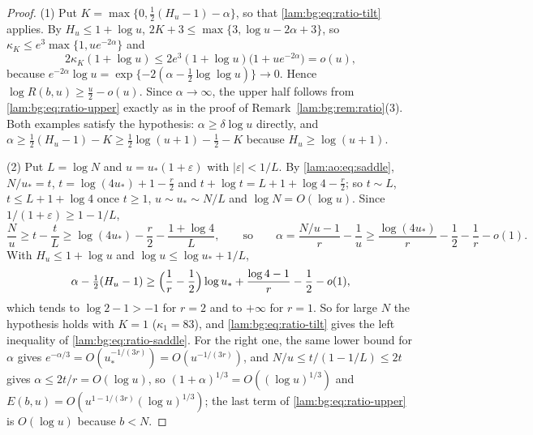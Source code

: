 \documentclass[11pt,a4paper]{article}
\numberwithin{equation}{section}
\theoremstyle{remark}
\begin{document}
\begin{proof}
(1) Put $K=\max\{0,\frac12(H_u-1)-\alpha\}$, so that \eqref{lam:bg:eq:ratio-tilt} applies. By $H_u\le1+\log u$, $2K+3\le\max\{3,\log u-2\alpha+3\}$, so $\kappa_K\le e^3\max\{1,ue^{-2\alpha}\}$ and
\[
 2\kappa_K(1+\log u)\le2e^3(1+\log u)\bigl(1+ue^{-2\alpha}\bigr)=o(u),
\]
because $e^{-2\alpha}\log u=\exp\{-2(\alpha-\frac12\log\log u)\}\to0$. Hence $\log R(b,u)\ge\frac u2-o(u)$. Since $\alpha\to\infty$, the upper half follows from \eqref{lam:bg:eq:ratio-upper} exactly as in the proof of Remark~\ref{lam:bg:rem:ratio}(3). Both examples satisfy the hypothesis: $\alpha\ge\delta\log u$ directly, and $\alpha\ge\frac12(H_u-1)-K\ge\frac12\log(u+1)-\frac12-K$ because $H_u\ge\log(u+1)$.

(2) Put $L=\log N$ and $u=u_*(1+\varepsilon)$ with $|\varepsilon|<1/L$. By \eqref{lam:ao:eq:saddle}, $N/u_*=t$, $t=\log(4u_*)+1-\frac r2$ and $t+\log t=L+1+\log4-\frac r2$; so $t\sim L$, $t\le L+1+\log4$ once $t\ge1$, $u\sim u_*\sim N/L$ and $\log N=O(\log u)$. Since $1/(1+\varepsilon)\ge1-1/L$,
\[
 \frac Nu\ge t-\frac tL\ge\log(4u_*)-\frac r2-\frac{1+\log4}L,\qquad\text{so}\qquad
 \alpha=\frac{N/u-1}r-\frac1u\ge\frac{\log(4u_*)}r-\frac12-\frac1r-o(1).
\]
With $H_u\le1+\log u$ and $\log u\le\log u_*+1/L$,
\[
 \alpha-\tfrac12(H_u-1)\ge\Bigl(\frac1r-\frac12\Bigr)\log u_*+\frac{\log4-1}r-\frac12-o(1),
\]
which tends to $\log2-1>-1$ for $r=2$ and to $+\infty$ for $r=1$. So for large $N$ the hypothesis holds with $K=1$ ($\kappa_1=83$), and \eqref{lam:bg:eq:ratio-tilt} gives the left inequality of \eqref{lam:bg:eq:ratio-saddle}. For the right one, the same lower bound for $\alpha$ gives $e^{-\alpha/3}=O(u_*^{-1/(3r)})=O(u^{-1/(3r)})$, and $N/u\le t/(1-1/L)\le2t$ gives $\alpha\le2t/r=O(\log u)$, so $(1+\alpha)^{1/3}=O((\log u)^{1/3})$ and $E(b,u)=O(u^{1-1/(3r)}(\log u)^{1/3})$; the last term of \eqref{lam:bg:eq:ratio-upper} is $O(\log u)$ because $b<N$.
\end{proof}
\end{document}
